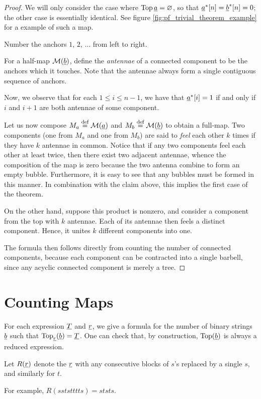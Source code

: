 \begin{proof}
	We will only consider the case where $\operatorname{Top} \underline{a} = \varnothing$, so that $\underline{a}^\ast[n] = \underline{b}^\ast[n] = 0$; the other case is essentially identical.  See figure \ref{fig:pf_trivial_theorem_example} for a example of such a map.

	Number the anchors $1$, $2$, $\dots$ from left to right.

	For a half-map $\mathcal M(\underline{b})$, define the \emph{antennae} of a connected component to be the anchors which it touches.  Note that the antennae always form a single contiguous sequence of anchors.

	Now, we observe that for each $1 \le i \le n-1$, we have that $\underline{a}^\ast[i] = 1$ if and only if $i$ and $i+1$ are both antennae of some component.

	Let us now compose $M_a \stackrel{\text{def}}{=} \mathcal M(\underline{a})$ and $M_b \stackrel{\text{def}}{=} \mathcal M(\underline{b})$ to obtain a full-map.  Two components (one from $M_a$ and one from $M_b$) are said to \emph{feel} each other $k$ times if they have $k$ antennae in common.  Notice that if any two components feel each other at least twice, then there exist two adjacent antennae, whence the composition of the map is zero because the two antenna combine to form an empty bubble.  Furthermore, it is easy to see that any bubbles must be formed in this manner.  In combination with the claim above, this implies the first case of the theorem.

	On the other hand, suppose this product is nonzero, and consider a component from the top with $k$ antennae.  Each of its antennae then feels a distinct component.  Hence, it unites $k$ different components into one.

	The formula then follows directly from counting the number of connected components, because each component can be contracted into a single barbell, since any acyclic connected component is merely a tree.
\end{proof}

\section{Counting Maps}
For each expression $\underline{T}$ and $\underline{r}$, we give a formula for the number of binary strings $\underline{b}$ such that $\operatorname{Top}_{\underline{r}}(\underline{b}) = \underline{T}$.  One can check that, by construction, $\operatorname{Top}(\underline{b})$ is always a reduced expression.

\begin{definition*}
	Let $R(\underline{r})$ denote the $\underline{r}$ with any consecutive blocks of $s$'s replaced by a single $s$, and similarly for $t$.
\end{definition*}
For example, $R(sststttts) = ststs$.

